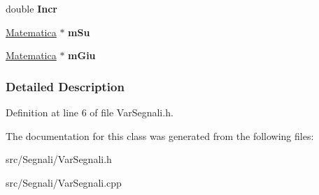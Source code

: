 \begin{DoxyCompactItemize}
\item 
\hypertarget{classVariabili_a891315d4365f283061bc7d4a1531df91}{double {\bfseries \-Incr}}\label{classVariabili_a891315d4365f283061bc7d4a1531df91}

\item 
\hypertarget{classVariabili_a9183b9e0d8b2ca559115ab7997093855}{\hyperlink{classMatematica}{\-Matematica} $\ast$ {\bfseries m\-Su}}\label{classVariabili_a9183b9e0d8b2ca559115ab7997093855}

\item 
\hypertarget{classVariabili_a2fbe4148b757ff50a40c170610e1fd94}{\hyperlink{classMatematica}{\-Matematica} $\ast$ {\bfseries m\-Giu}}\label{classVariabili_a2fbe4148b757ff50a40c170610e1fd94}

\end{DoxyCompactItemize}


\subsubsection{\-Detailed \-Description}


\-Definition at line 6 of file \-Var\-Segnali.\-h.



\-The documentation for this class was generated from the following files\-:\begin{DoxyCompactItemize}
\item 
src/\-Segnali/\-Var\-Segnali.\-h\item 
src/\-Segnali/\-Var\-Segnali.\-cpp\end{DoxyCompactItemize}

